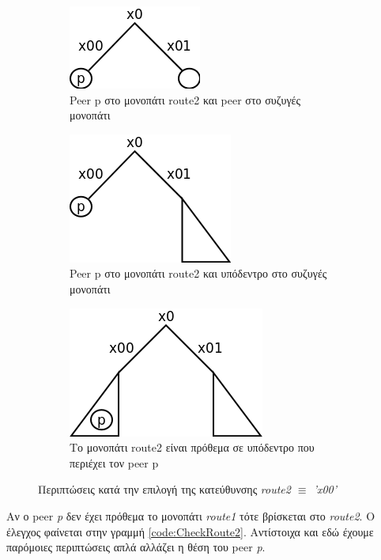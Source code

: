 \begin{figure}[ht]
    \centering
    \begin{subfigure}[b]{0.3\textwidth}
        \centering
        \includegraphics[scale=0.4]{Figures/Protocol/route2equiv_conPeer.png}
        \caption{Peer p στο μονοπάτι route2 και peer στο συζυγές μονοπάτι}
        \label{fig:Route2Case1a}
    \end{subfigure}
    \quad
    \begin{subfigure}[b]{0.3\textwidth}
        \centering
        \includegraphics[scale=0.4]{Figures/Protocol/route2equiv_conSubtree.png}
        \caption{Peer p στο μονοπάτι route2 και υπόδεντρο στο συζυγές μονοπάτι}
        \label{fig:Route2Case1b}
    \end{subfigure}
    \quad
    \begin{subfigure}[b]{0.3\textwidth}
        \centering
        \includegraphics[scale=0.4]{Figures/Protocol/route2subtree_conSubtree.png}
        \caption{Το μονοπάτι route2 είναι πρόθεμα σε υπόδεντρο που περιέχει τον peer p}
        \label{fig:Route2Case2}
    \end{subfigure}
    \caption{Περιπτώσεις κατά την επιλογή της κατεύθυνσης \textit{route2 $\equiv$ 'x00'}}
    \label{fig:Route2}
\end{figure}

Αν ο peer \textit{p} δεν έχει πρόθεμα το μονοπάτι \textit{route1} τότε 
βρίσκεται στο \textit{route2}. Ο έλεγχος φαίνεται στην γραμμή 
\ref{code:CheckRoute2}. Αντίστοιχα και εδώ έχουμε παρόμοιες περιπτώσεις απλά 
αλλάζει η θέση του peer \textit{p}. 

